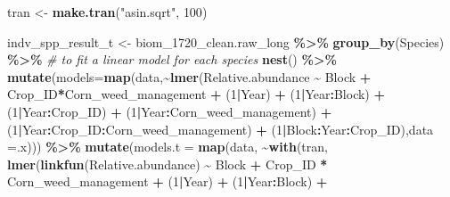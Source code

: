 \documentclass[
]{article}
\newenvironment{Shaded}{\begin{snugshade}}{\end{snugshade}}
\newcommand{\AttributeTok}[1]{\textcolor[rgb]{0.13,0.29,0.53}{#1}}
\newcommand{\CommentTok}[1]{\textcolor[rgb]{0.56,0.35,0.01}{\textit{#1}}}
\newcommand{\DecValTok}[1]{\textcolor[rgb]{0.00,0.00,0.81}{#1}}
\newcommand{\FunctionTok}[1]{\textcolor[rgb]{0.13,0.29,0.53}{\textbf{#1}}}
\newcommand{\NormalTok}[1]{#1}
\newcommand{\OtherTok}[1]{\textcolor[rgb]{0.56,0.35,0.01}{#1}}
\newcommand{\SpecialCharTok}[1]{\textcolor[rgb]{0.81,0.36,0.00}{\textbf{#1}}}
\newcommand{\StringTok}[1]{\textcolor[rgb]{0.31,0.60,0.02}{#1}}
\begin{document}
\begin{Shaded}
\begin{Highlighting}[]
\NormalTok{tran }\OtherTok{\textless{}{-}} \FunctionTok{make.tran}\NormalTok{(}\StringTok{"asin.sqrt"}\NormalTok{, }\DecValTok{100}\NormalTok{)}

\NormalTok{indv\_spp\_result\_t }\OtherTok{\textless{}{-}}\NormalTok{ biom\_1720\_clean.raw\_long }\SpecialCharTok{\%\textgreater{}\%}
  \FunctionTok{group\_by}\NormalTok{(Species) }\SpecialCharTok{\%\textgreater{}\%} \CommentTok{\# to fit a linear model for each species}
  \FunctionTok{nest}\NormalTok{() }\SpecialCharTok{\%\textgreater{}\%}
  \FunctionTok{mutate}\NormalTok{(}\AttributeTok{models=}\FunctionTok{map}\NormalTok{(data,}\SpecialCharTok{\textasciitilde{}}\FunctionTok{lmer}\NormalTok{(Relative.abundance }\SpecialCharTok{\textasciitilde{}}\NormalTok{ Block }\SpecialCharTok{+}
\NormalTok{                                 Crop\_ID}\SpecialCharTok{*}\NormalTok{Corn\_weed\_management }\SpecialCharTok{+} 
\NormalTok{                        (}\DecValTok{1}\SpecialCharTok{|}\NormalTok{Year) }\SpecialCharTok{+}\NormalTok{ (}\DecValTok{1}\SpecialCharTok{|}\NormalTok{Year}\SpecialCharTok{:}\NormalTok{Block) }\SpecialCharTok{+} 
\NormalTok{                       (}\DecValTok{1}\SpecialCharTok{|}\NormalTok{Year}\SpecialCharTok{:}\NormalTok{Crop\_ID) }\SpecialCharTok{+}\NormalTok{ (}\DecValTok{1}\SpecialCharTok{|}\NormalTok{Year}\SpecialCharTok{:}\NormalTok{Corn\_weed\_management) }\SpecialCharTok{+} 
\NormalTok{                       (}\DecValTok{1}\SpecialCharTok{|}\NormalTok{Year}\SpecialCharTok{:}\NormalTok{Crop\_ID}\SpecialCharTok{:}\NormalTok{Corn\_weed\_management)  }\SpecialCharTok{+}\NormalTok{ (}\DecValTok{1}\SpecialCharTok{|}\NormalTok{Block}\SpecialCharTok{:}\NormalTok{Year}\SpecialCharTok{:}\NormalTok{Crop\_ID),}\AttributeTok{data =}\NormalTok{.x))) }\SpecialCharTok{\%\textgreater{}\%}
  \FunctionTok{mutate}\NormalTok{(}\AttributeTok{models.t =} \FunctionTok{map}\NormalTok{(data, }\SpecialCharTok{\textasciitilde{}}\FunctionTok{with}\NormalTok{(tran, }
                                  \FunctionTok{lmer}\NormalTok{(}\FunctionTok{linkfun}\NormalTok{(Relative.abundance) }\SpecialCharTok{\textasciitilde{}}\NormalTok{ Block }\SpecialCharTok{+}
\NormalTok{                                         Crop\_ID }\SpecialCharTok{*}\NormalTok{ Corn\_weed\_management }\SpecialCharTok{+} 
\NormalTok{                                         (}\DecValTok{1}\SpecialCharTok{|}\NormalTok{Year) }\SpecialCharTok{+}\NormalTok{ (}\DecValTok{1}\SpecialCharTok{|}\NormalTok{Year}\SpecialCharTok{:}\NormalTok{Block) }\SpecialCharTok{+} 

\end{Highlighting}
\end{Shaded}
\end{document}
